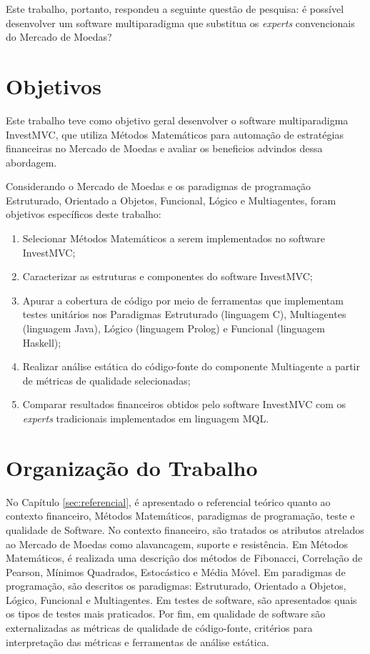 Este trabalho, portanto, respondeu a seguinte questão de pesquisa: é possível desenvolver um software multiparadigma que substitua os \textit{experts} convencionais do Mercado de Moedas?

\section{Objetivos}
\label{sec:objetivos}

Este trabalho teve como objetivo geral desenvolver o software multiparadigma InvestMVC, que utiliza Métodos Matemáticos para automação de estratégias financeiras no Mercado de Moedas e avaliar os beneficios advindos dessa abordagem.

Considerando o Mercado de Moedas e os paradigmas de programação Estruturado, Orientado a Objetos, Funcional, Lógico e Multiagentes, foram objetivos específicos deste trabalho:

\begin{enumerate}
\item  Selecionar Métodos Matemáticos a serem implementados no software InvestMVC;

\item Caracterizar as estruturas e componentes do software InvestMVC;

\item Apurar a cobertura de código por meio de ferramentas que implementam testes unitários nos Paradigmas Estruturado (linguagem C), Multiagentes (linguagem Java), Lógico (linguagem Prolog) e Funcional (linguagem Haskell);

\item  Realizar análise estática do código-fonte do componente Multiagente a partir de métricas de qualidade selecionadas;

\item Comparar resultados financeiros obtidos pelo software InvestMVC com os \textit{experts} tradicionais implementados em linguagem MQL.
\end{enumerate}

\section{Organização do Trabalho}
No Capítulo \ref{sec:referencial}, é apresentado o referencial teórico quanto ao contexto financeiro, Métodos Matemáticos, paradigmas de programação, teste e qualidade de Software. No contexto financeiro, são tratados os atributos atrelados ao Mercado de Moedas como alavancagem, suporte e resistência. Em Métodos Matemáticos, é realizada uma descrição dos métodos de Fibonacci, Correlação de Pearson, Mínimos Quadrados, Estocástico e Média Móvel. Em paradigmas de programação, são descritos os paradigmas: Estruturado, Orientado a Objetos, Lógico, Funcional e Multiagentes. Em testes de software, são apresentados quais os tipos de testes mais praticados. Por fim, em qualidade de software são externalizadas as métricas de qualidade de código-fonte, critérios para interpretação das métricas e ferramentas de análise estática.

